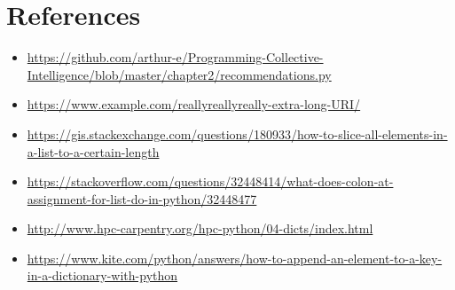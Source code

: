 \documentclass[12pt]{article}
\begin{document}
\section*{References}
\begin{itemize}
    \item {\url{https://github.com/arthur-e/Programming-Collective-Intelligence/blob/master/chapter2/recommendations.py}}
     \item {\url{https://www.example.com/reallyreallyreally-extra-long-URI/}}
     \item {\url{https://gis.stackexchange.com/questions/180933/how-to-slice-all-elements-in-a-list-to-a-certain-length}}
     \item {\url{https://stackoverflow.com/questions/32448414/what-does-colon-at-assignment-for-list-do-in-python/32448477}}
     \item {\url{http://www.hpc-carpentry.org/hpc-python/04-dicts/index.html}}
     \item {\url{https://www.kite.com/python/answers/how-to-append-an-element-to-a-key-in-a-dictionary-with-python}}
\end{itemize}
\end{document}
